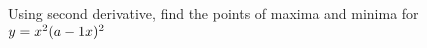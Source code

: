 
%
%
%
%
% 
% 



\question[3] Using second derivative, find the points of maxima and minima for $y=x^2(a-1 x)^2$

\watchout

